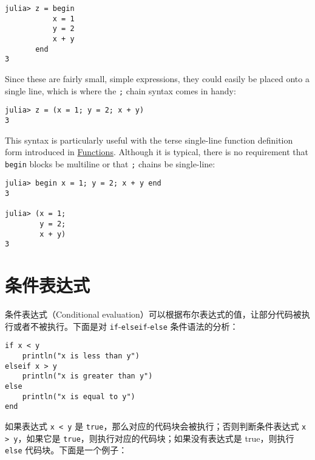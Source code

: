 \begin{verbatim}
julia> z = begin
           x = 1
           y = 2
           x + y
       end
3
\end{verbatim}



Since these are fairly small, simple expressions, they could easily be placed onto a single line, which is where the \texttt{;} chain syntax comes in handy:




\begin{verbatim}
julia> z = (x = 1; y = 2; x + y)
3
\end{verbatim}



This syntax is particularly useful with the terse single-line function definition form introduced in \hyperlink{645008301484218813}{Functions}. Although it is typical, there is no requirement that \texttt{begin} blocks be multiline or that \texttt{;} chains be single-line:




\begin{verbatim}
julia> begin x = 1; y = 2; x + y end
3

julia> (x = 1;
        y = 2;
        x + y)
3
\end{verbatim}



\hypertarget{9876835618453764646}{}


\section{条件表达式}



条件表达式（Conditional evaluation）可以根据布尔表达式的值，让部分代码被执行或者不被执行。下面是对 \texttt{if}-\texttt{elseif}-\texttt{else} 条件语法的分析：




\begin{verbatim}
if x < y
    println("x is less than y")
elseif x > y
    println("x is greater than y")
else
    println("x is equal to y")
end
\end{verbatim}



如果表达式 \texttt{x < y} 是 \texttt{true}，那么对应的代码块会被执行；否则判断条件表达式 \texttt{x > y}，如果它是 \texttt{true}，则执行对应的代码块；如果没有表达式是 true，则执行 \texttt{else} 代码块。下面是一个例子：




